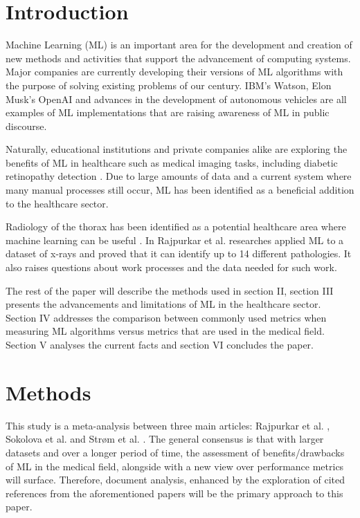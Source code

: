 \documentclass[fullpage]{article}
\begin{document}
\begin{multicols}{2}
\section{Introduction}
Machine Learning (ML) is an important area for the development and creation of new methods and activities that support the advancement of computing systems. Major companies are currently developing their versions of ML algorithms with the purpose of solving existing problems of our century. IBM’s Watson, Elon Musk’s OpenAI and advances in the development of autonomous vehicles \cite{IDA2017} are all examples of ML implementations that are raising awareness of ML in public discourse.

Naturally, educational institutions and private companies alike are exploring the benefits of ML in healthcare such as medical imaging tasks, including diabetic retinopathy detection \cite{Gulshan2016}. Due to large amounts of data and a current system where many manual processes still occur, ML has been identified as a beneficial addition to the healthcare sector\cite{RWBOMLH}.

Radiology of the thorax has been identified as a potential healthcare area where machine learning can be useful \cite{Rajpurkar}. In Rajpurkar et al.\cite{Rajpurkar} researches applied ML to a dataset of x-rays and proved that it can identify up to 14 different pathologies. It also raises questions about work processes and the data needed for such work.

The rest of the paper will describe the methods used in section II, section III presents the advancements and limitations of ML in the healthcare sector. Section IV addresses the comparison between commonly used metrics  when measuring ML algorithms versus metrics that are used in the medical field. Section V analyses the current facts and section VI concludes the paper.
\section{Methods}
This study is a meta-analysis between three main articles: Rajpurkar et al. \cite{Rajpurkar}, Sokolova et al. \cite{Sokolova2006} and Strøm et al. \cite{Strom2018}. The general consensus is that with larger datasets and over a longer period of time, the assessment of benefits/drawbacks of ML in the medical field, alongside with a new view over performance metrics will surface.
Therefore, document analysis, enhanced by the exploration of cited references from the aforementioned papers will be the primary approach to this paper. 


\end{multicols}
\end{document}
